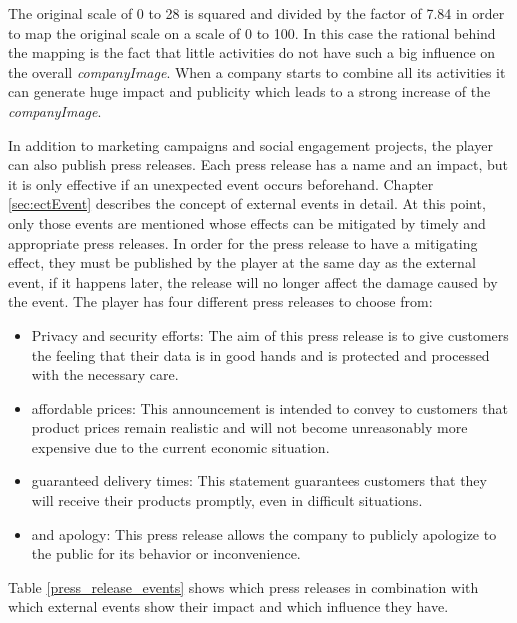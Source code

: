 The original scale of 0 to 28 is squared and divided by the factor of 7.84 in order to map the original scale on a scale of 0 to 100. In this case the rational behind the mapping is the fact that little activities do not have such  a big influence on the overall \textit{companyImage}. When a company starts to combine all its activities it can generate huge impact and publicity which leads to a strong increase of the \textit{companyImage}.

In addition to marketing campaigns and social engagement projects, the player can also publish press releases. Each press release has a name and an impact, but it is only effective if an unexpected event occurs beforehand. Chapter \ref{sec:ectEvent} describes the concept of external events in detail. At this point, only those events are mentioned whose effects can be mitigated by timely and appropriate press releases.
In order for the press release to have a mitigating effect, they must be published by the player at the same day as the external event, if it happens later, the release will no longer affect the damage caused by the event. The player has four different press releases to choose from: 
\begin{itemize}
    \item Privacy and security efforts: The aim of this press release is to give customers the feeling that their data is in good hands and is protected and processed with the necessary care.  
    \item affordable prices: This announcement is intended to convey to customers that product prices remain realistic and will not become unreasonably more expensive due to the current economic situation. 
    \item guaranteed delivery times: This statement guarantees customers that they will receive their products promptly, even in difficult situations. 
    \item and apology: This press release allows the company to publicly apologize to the public for its behavior or inconvenience.
\end{itemize}

Table \ref{press_release_events} shows which press releases in combination with which external events show their impact and which influence they have.

